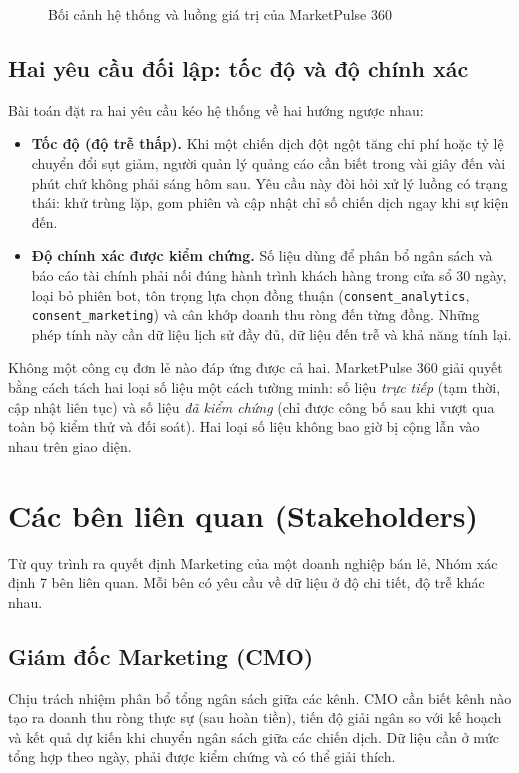 \begin{figure}[H]
    \centering
    \resizebox{\textwidth}{!}{}
    \caption{Bối cảnh hệ thống và luồng giá trị của MarketPulse 360}
    \label{fig:system-context}
\end{figure}

\subsection{Hai yêu cầu đối lập: tốc độ và độ chính xác}
\label{sec:c1-hai-yeu-cau}

Bài toán đặt ra hai yêu cầu kéo hệ thống về hai hướng ngược nhau:

\begin{itemize}
    \item \textbf{Tốc độ (độ trễ thấp).} Khi một chiến dịch đột ngột tăng chi phí hoặc tỷ lệ chuyển đổi sụt giảm, người quản lý quảng cáo cần biết trong vài giây đến vài phút chứ không phải sáng hôm sau. Yêu cầu này đòi hỏi xử lý luồng có trạng thái: khử trùng lặp, gom phiên và cập nhật chỉ số chiến dịch ngay khi sự kiện đến.
    \item \textbf{Độ chính xác được kiểm chứng.} Số liệu dùng để phân bổ ngân sách và báo cáo tài chính phải nối đúng hành trình khách hàng trong cửa sổ 30 ngày, loại bỏ phiên bot, tôn trọng lựa chọn đồng thuận (\texttt{consent\_analytics}, \texttt{consent\_marketing}) và cân khớp doanh thu ròng đến từng đồng. Những phép tính này cần dữ liệu lịch sử đầy đủ, dữ liệu đến trễ và khả năng tính lại.
\end{itemize}

Không một công cụ đơn lẻ nào đáp ứng được cả hai. MarketPulse 360 giải quyết bằng cách tách hai loại số liệu một cách tường minh: số liệu \emph{trực tiếp} (tạm thời, cập nhật liên tục) và số liệu \emph{đã kiểm chứng} (chỉ được công bố sau khi vượt qua toàn bộ kiểm thử và đối soát). Hai loại số liệu không bao giờ bị cộng lẫn vào nhau trên giao diện.

\section{Các bên liên quan (Stakeholders)}
\label{sec:c1-stakeholders}

Từ quy trình ra quyết định Marketing của một doanh nghiệp bán lẻ, Nhóm xác định 7 bên liên quan. Mỗi bên có yêu cầu về dữ liệu ở độ chi tiết, độ trễ khác nhau.

\subsection{Giám đốc Marketing (CMO)}
\label{sec:c1-sh-cmo}
Chịu trách nhiệm phân bổ tổng ngân sách giữa các kênh. CMO cần biết kênh nào tạo ra doanh thu ròng thực sự (sau hoàn tiền), tiến độ giải ngân so với kế hoạch và kết quả dự kiến khi chuyển ngân sách giữa các chiến dịch. Dữ liệu cần ở mức tổng hợp theo ngày, phải được kiểm chứng và có thể giải thích.

